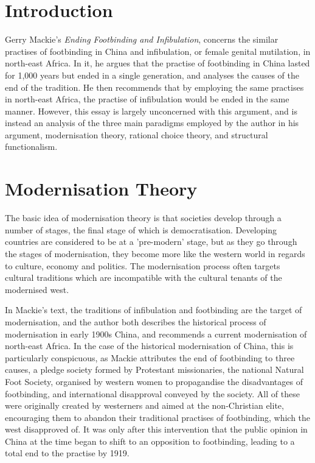 \documentclass[twoside, 11pt]{article}
\begin{document}
\section*{Introduction}
	Gerry Mackie's \textit{Ending Footbinding and Infibulation}, \cite{Mackie1996} concerns the similar practises of footbinding in China and infibulation, or female genital mutilation, in north-east Africa. In it, he argues that the practise of footbinding in China lasted for 1,000 years but ended in a single generation, and analyses the causes of the end of the tradition. He then recommends that by employing the same practises in north-east Africa, the practise of infibulation would be ended in the same manner. However, this essay is largely unconcerned with this argument, and is instead an analysis of the three main paradigms employed by the author in his argument, modernisation theory, rational choice theory, and structural functionalism. 

\section*{Modernisation Theory}
	The basic idea of modernisation theory is that societies develop through a number of stages, the final stage of which is democratisation. \cite[p.158]{Przeworski1997} Developing countries are considered to be at a 'pre-modern' stage, but as they go through the stages of modernisation, they become more like the western world in regards to culture, economy and politics. The modernisation process often targets cultural traditions which are incompatible with the cultural tenants of the modernised west. 

	In Mackie's text, the traditions of infibulation and footbinding are the target of modernisation, and the author both describes the historical process of modernisation in early 1900s China, and recommends a current modernisation of north-east Africa. In the case of the historical modernisation of China, this is particularly conspicuous, as Mackie attributes the end of footbinding to three causes, a pledge society formed by Protestant missionaries, the national Natural Foot Society, organised by western women to propagandise the disadvantages of footbinding, and international disapproval conveyed by the society.\cite[p.1001]{Mackie1996} All of these were originally created by westerners and aimed at the non-Christian elite, encouraging them to abandon their traditional practises of footbinding, which the west disapproved of. It was only after this intervention that the public opinion in China at the time began to shift to an opposition to footbinding, leading to a total end to the practise by 1919. 
\end{document}
